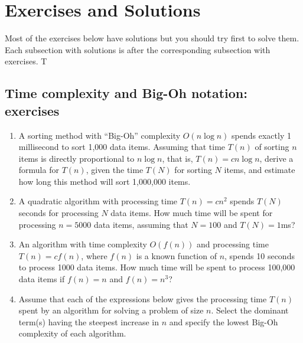 \documentclass[]{article}
\begin{document}
\section{Exercises and Solutions}

Most of the exercises below have solutions but you should try
first to solve them. Each subsection with solutions is after
the corresponding subsection with exercises. T

\subsection{Time complexity and Big-Oh notation: exercises}

\begin{enumerate}

\item A sorting method with
``Big-Oh'' complexity \(O(n \log n )\) spends            
exactly 1 millisecond to sort 1,000 data items. 
Assuming that time \(T(n)\) of sorting \(n\) 
items is directly proportional to
\(n \log n\), that is, \(T(n)=cn\log n\),
derive a formula for \(T(n)\), given the time \(T(N)\) 
for sorting \(N\) items, and estimate 
how long this method will sort 1,000,000 items.
       
\item A quadratic algorithm with 
processing time \(T(n)=cn^2 \)
spends $T(N)$ seconds for processing $N$ data items. How much time 
will be spent for
processing $n=5000$ data items, assuming that $N=100$ and 
$T(N)=1$ms? 

\item An algorithm with time complexity $O(f(n))$ and
processing time $T(n) = cf(n)$, where \(f(n)\) is a known
function of \(n\), spends 10 seconds to process 
1000 data items. 
How much time will be spent
to process 100,000 data items if \(f(n) = n\) and \(f(n)=n^3\)? 

\item
Assume that each of the expressions below gives the
processing time \(T(n)\) spent by an algorithm for 
solving a problem of size \(n\). Select the dominant 
term(s) having the steepest increase in \(n\) 
and specify the lowest Big-Oh complexity of each algorithm.\\


\end{enumerate}
\end{document}
